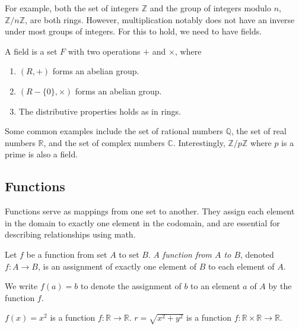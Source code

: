 \documentclass[12pt]{article}
\begin{document}
For example, both the set of integers $\mathbb{Z}$ and the group of integers modulo $n$, $\mathbb{Z}/n\mathbb{Z}$, are both rings. However, multiplication notably does not have an inverse under most groups of integers. For this to hold, we need to have fields. 

\begin{definition}[Field]
    A field is a set $F$ with two operations $+$ and $\times$, where
    \begin{enumerate}
        \item $(R, +)$ forms an abelian group. 
        \item $(R - \{0\}, \times)$ forms an abelian group. 
        \item The distributive properties holds as in rings. 
    \end{enumerate}
\end{definition}

Some common examples include the set of rational numbers $\mathbb{Q}$, the set of real numbers $\mathbb{R}$, and the set of complex numbers $\mathbb{C}$. Interestingly, $\mathbb{Z}/p\mathbb{Z}$ where $p$ is a prime is also a field.

\subsection{Functions}

Functions serve as mappings from one set to another. They assign each element in the domain to exactly one element in the codomain, and are essential for describing relationships using math. 

\begin{definition}[Function]
Let $f$ be a function from set $A$ to set $B$. \textit{A function from $A$ to $B$}, denoted $f : A \to B$, is an assignment of exactly one element of $B$ to each element of $A$. 
\end{definition}

We write $f(a) = b$ to denote the assignment of $b$ to an element $a$ of $A$ by the function $f$.

\begin{example}
$f(x) = x^2$ is a function $f : \mathbb{R} \rightarrow \mathbb{R}$. \quad $r = \sqrt{x^2 + y^2}$ is a function $f : \mathbb{R} \times \mathbb{R} \rightarrow \mathbb{R}$.
\end{example}
\end{document}
